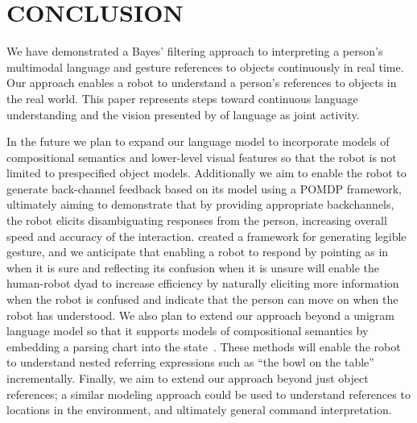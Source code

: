 \documentclass[letterpaper, 10 pt, conference]{ieeeconf}
\begin{document}
\section{CONCLUSION}

We have demonstrated a Bayes' filtering approach to interpreting a
person's multimodal language and gesture references to objects
continuously in real time.  Our approach enables a robot to understand
a person's references to objects in the real world.  This paper
represents steps toward continuous language understanding and the
vision presented by \citet{clark96} of language as joint activity.

In the future we plan to expand our language model to incorporate
models of compositional semantics and lower-level visual features so
that the robot is not limited to prespecified object models.
Additionally we aim to enable the robot to generate back-channel
feedback based on its model using a POMDP framework, ultimately aiming
to demonstrate that by providing appropriate backchannels, the robot
elicits disambiguating responses from the person, increasing overall
speed and accuracy of the interaction.  \citet{dragan13} created a
framework for generating legible gesture, and we anticipate that
enabling a robot to respond by pointing as in \citet{holladay14} when
it is sure and reflecting its confusion when it is unsure will enable
the human-robot dyad to increase efficiency by naturally eliciting
more information when the robot is confused and indicate that the
person can move on when the robot has understood.  We also plan to
extend our approach beyond a unigram language model so that it
supports models of compositional semantics by embedding a parsing
chart into the state~\citep{jurafsky95, earley70}.  These methods will
enable the robot to understand nested referring expressions such as
``the bowl on the table'' incrementally.  Finally, we aim to extend
our approach beyond just object references; a similar modeling
approach could be used to understand references to locations in the
environment, and ultimately general command interpretation. 



\end{document}
